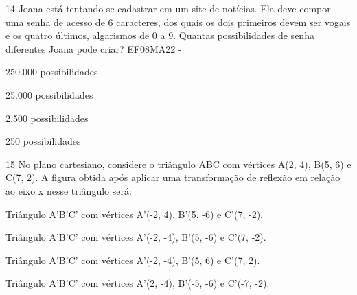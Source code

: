 

\num{14} Joana está tentando se cadastrar em um site de notícias. Ela deve
compor uma senha de acesso de 6 caracteres, dos quais os dois primeiros
devem ser vogais e os quatro últimos, algarismos de 0 a 9. Quantas
possibilidades de senha diferentes Joana pode criar? EF08MA22 -
\item 250.000 possibilidades
\item 25.000 possibilidades
\item 2.500 possibilidades
\item 250 possibilidades







\num{15} No plano cartesiano, considere o triângulo ABC com vértices A(2, 4),
B(5, 6) e C(7, 2). A figura obtida após aplicar uma transformação de
reflexão em relação ao eixo x nesse triângulo será:
\item Triângulo A'B'C' com vértices A'(-2, 4), B'(5, -6) e C'(7, -2).
\item Triângulo A'B'C' com vértices A'(-2, -4), B'(5, -6) e C'(7, -2).
\item Triângulo A'B'C' com vértices A'(-2, -4), B'(5, 6) e C'(7, 2).
\item Triângulo A'B'C' com vértices A'(2, -4), B'(-5, -6) e C'(-7, -2).


